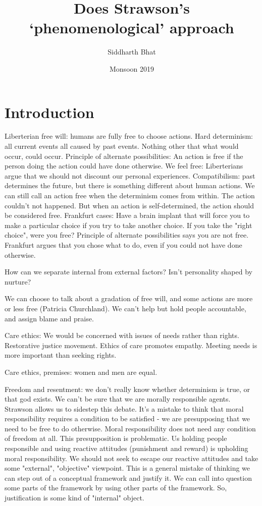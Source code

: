 \documentclass{article}
\title{Does Strawson's ‘phenomenological’ approach}
\author{Siddharth Bhat}
\date{Monsoon 2019}
\begin{document}
 
\maketitle

\section{Introduction}
Liberterian free will: humans are fully free to choose actions.
Hard determinism: all current events all caused by past events. Nothing other
that what would occur, could occur.
Principle of alternate possibilities: An action is free if the person doing
the action could have done otherwise.
We feel free: Liberterians argue that we should not discount our personal
experiences. 
Compatibilism: past determines the future, but there is something different
about human actions. We can still call an action free when the determinism
comes from within. The action couldn't not happened. But when an action
is self-determined, the action should be considered free.
Frankfurt cases: Have a brain implant that will force you to make a particular
choice if you try to take another choice. If you take the "right choice", were
you free? Principle of alternate possibilities says you are not free. 
Frankfurt argues that you chose what to do, even if you could not have done
otherwise.

How can we separate internal from external factors? Isn't personality shaped
by nurture? 

We can choose to talk about a gradation of free will, and some actions are
more or less free (Patricia Churchland). We can't help but hold people accountable,
and assign blame and praise.

Care ethics: We would be concerned with issues of needs rather than rights.
Restorative justice movement. Ethics of care promotes empathy. Meeting
needs is more important than seeking rights. 

Care ethics, premises: women and men are equal.


Freedom and resentment: we don't really know whether determinism is true,
or that god exists. We can't be sure that we are morally responsible agents.
Strawson allows us to sidestep this debate. It's a mistake to think that
moral responsibility requires a condition to be satisfied - we are presupposing
that we need to be free to do otherwise. Moral responsibility does not need
any condition of freedom at all. This presupposition is problematic. Us holding
people responsible and using reactive attitudes (punishment and reward) is
upholding moral responsibility. We should not seek to escape our reactive 
attitudes and take some "external", "objective" viewpoint. This is a general
mistake of thinking we can step out of a conceptual framework and justify it.
We can call into question some parts of the framework by using other parts
of the framework. So, justification is some kind of "internal" object.
\end{document}
